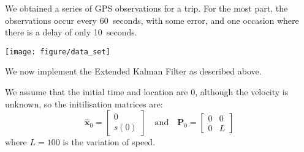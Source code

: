 \documentclass[11pt]{article}\usepackage[]{graphicx}\usepackage[]{color}
\newenvironment{knitrout}{}{} %
\begin{document}
We obtained a series of GPS observations for a trip.
For the most part, the observations occur every 60~seconds, with some error, and one
occasion where there is a delay of only 10~seconds.
\begin{knitrout}
\color{fgcolor}

{\centering \texttt{[image: figure/data\_set]}

}



\end{knitrout}


We now implement the Extended Kalman Filter as described above.


We assume that the initial time and location are 0, although the velocity is unknown, so the initilisation matrices are:
\begin{equation*}
  \mathbf{\hat x}_0 =
  \begin{bmatrix}
    0 \\ s(0)
  \end{bmatrix}
  \quad \text{and} \quad
  \mathbf{P}_0 =
  \begin{bmatrix}
    0 & 0 \\ 0 & L
  \end{bmatrix}
\end{equation*}
where $L = 100$ is the variation of speed.
\end{document}
